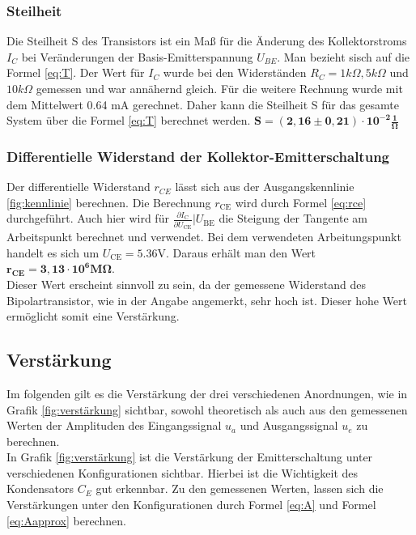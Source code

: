 \documentclass[a4paper,usenatbib]{aspdoc}
\begin{document}
        \subsubsection{Steilheit}\label{subsec:Steil}
            Die Steilheit S des Transistors ist ein Maß für die Änderung des Kollektorstroms $I_C$ bei Veränderungen der Basis-Emitterspannung $U_{BE}$. Man bezieht sisch auf die Formel \ref{eq:T}. Der Wert für $I_C$ wurde bei den Widerständen $R_C = 1k\Omega , 5k\Omega$ und $10 k\Omega$ gemessen und war annähernd gleich. Für die weitere Rechnung wurde mit dem Mittelwert 0.64 mA gerechnet. Daher kann die Steilheit S für das gesamte System über die Formel \ref{eq:T} berechnet werden. 
            $\mathbf{S = (2,16 \pm 0,21) \cdot 10^{-2} \frac{1}{\Omega}}$ \\
            
            
        \subsubsection{Differentielle Widerstand der Kollektor-Emitterschaltung}
            Der differentielle Widerstand $r_{CE}$ lässt sich aus der Ausgangskennlinie \ref{fig:kennlinie} berechnen. Die Berechnung $r_{\mathrm{CE}}$ wird durch Formel \ref{eq:rce} durchgeführt. Auch hier wird für $\frac{\partial I_{\mathrm{C}}}{\partial U_{\mathrm{CE}}} | U_{\mathrm{BE}}$ die Steigung der Tangente am Arbeitspunkt berechnet und verwendet. Bei dem verwendeten Arbeitungspunkt handelt es sich um $U_{\mathrm{CE}} = 5.36$V. Daraus erhält man den Wert $\mathbf{r_{CE} = 3,13 \cdot 10^{6} M\Omega}$.\\
            Dieser Wert erscheint sinnvoll zu sein, da der gemessene Widerstand des Bipolartransistor, wie in der Angabe angemerkt, sehr hoch ist. Dieser hohe Wert ermöglicht somit eine Verstärkung. \\
            
            
    
        \subsection{Verstärkung}\label{subsec:Versärkung}
            Im folgenden gilt es die Verstärkung der drei verschiedenen Anordnungen, wie in Grafik \ref{fig:verstärkung} sichtbar, sowohl theoretisch als auch aus den gemessenen Werten der Amplituden des Eingangssignal $u_a$ und Ausgangssignal $u_e$ zu berechnen.\\
            In Grafik \ref{fig:verstärkung} ist die Verstärkung der Emitterschaltung unter verschiedenen Konfigurationen sichtbar. Hierbei ist die Wichtigkeit des Kondensators $C_E$ gut erkennbar. Zu den gemessenen Werten, lassen sich die Verstärkungen unter den Konfigurationen durch Formel \ref{eq:A} und Formel \ref{eq:Aapprox} berechnen. 
            
\end{document}
